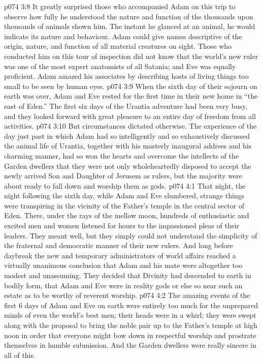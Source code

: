 \vs p074 3:8 It greatly surprised those who accompanied Adam on this trip to observe how fully he understood the nature and function of the thousands upon thousands of animals shown him. The instant he glanced at an animal, he would indicate its nature and behaviour. Adam could give names descriptive of the origin, nature, and function of all material creatures on sight. Those who conducted him on this tour of inspection did not know that the world’s new ruler was one of the most expert anatomists of all Satania; and Eve was equally proficient. Adam amazed his associates by describing hosts of living things too small to be seen by human eyes.
\vs p074 3:9 When the sixth day of their sojourn on earth was over, Adam and Eve rested for the first time in their new home in “the east of Eden.” The first six days of the Urantia adventure had been very busy, and they looked forward with great pleasure to an entire day of freedom from all activities.
\vs p074 3:10 But circumstances dictated otherwise. The experience of the day just past in which Adam had so intelligently and so exhaustively discussed the animal life of Urantia, together with his masterly inaugural address and his charming manner, had so won the hearts and overcome the intellects of the Garden dwellers that they were not only wholeheartedly disposed to accept the newly arrived Son and Daughter of Jerusem as rulers, but the majority were about ready to fall down and worship them as gods.
\vs p074 4:1 That night, the night following the sixth day, while Adam and Eve slumbered, strange things were transpiring in the vicinity of the Father’s temple in the central sector of Eden. There, under the rays of the mellow moon, hundreds of enthusiastic and excited men and women listened for hours to the impassioned pleas of their leaders. They meant well, but they simply could not understand the simplicity of the fraternal and democratic manner of their new rulers. And long before daybreak the new and temporary administrators of world affairs reached a virtually unanimous conclusion that Adam and his mate were altogether too modest and unassuming. They decided that Divinity had descended to earth in bodily form, that Adam and Eve were in reality gods or else so near such an estate as to be worthy of reverent worship.
\vs p074 4:2 The amazing events of the first 6 days of Adam and Eve on earth were entirely too much for the unprepared minds of even the world’s best men; their heads were in a whirl; they were swept along with the proposal to bring the noble pair up to the Father’s temple at high noon in order that everyone might bow down in respectful worship and prostrate themselves in humble submission. And the Garden dwellers were really sincere in all of this.
